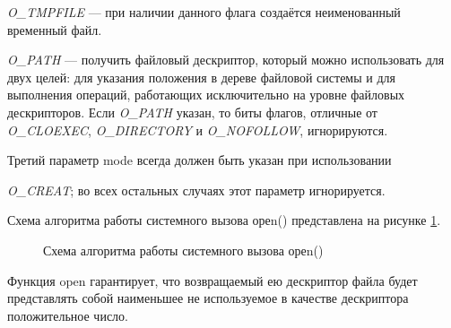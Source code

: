 \textit{O\_TMPFILE} — при наличии данного флага создаётся неименованный временный файл.

\textit{O\_PATH} — получить файловый дескриптор, который можно использовать для двух целей: для указания положения в дереве файловой системы и для выполнения операций, работающих исключительно на уровне файловых дескрипторов. Если \textit{O\_PATH} указан, то биты флагов,  отличные от \textit{O\_CLOEXEC}, \textit{O\_DIRECTORY} и \textit{O\_NOFOLLOW}, игнорируются.


Третий параметр mode всегда должен быть указан при использовании 

\noindent\textit{O\_CREAT}; во всех остальных случаях этот параметр игнорируется.


Схема алгоритма работы системного вызова ореn() представлена на рисунке \ref{fig:open}.
\clearpage
\begin{figure}[ph!]
	\caption{Схема алгоритма работы системного вызова ореn()}
	\label{fig:open}
\end{figure}

Функция open гарантирует, что возвращаемый ею дескриптор файла будет представлять собой наименьшее не используемое в качестве дескриптора положительное число.



